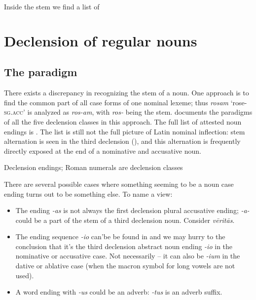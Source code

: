 \documentclass[a4paper, oneside, 12pt]{report}
\newcommand*{\citepage}[1]{p.~{#1}}
\newcommand{\form}[1]{\emph{#1}}
\newcommand*{\category}[1]{\textsc{#1}}
\newcommand{\translate}[1]{`#1'}
\begin{document}
Inside the stem we find a list of 

\section{Declension of regular nouns}\label{sec:regular-noun-declension}

\subsection{The paradigm}\label{sec:noun.paradigm.introduction}

There exists a discrepancy in recognizing the stem of a noun.
One approach is to find the common part 
of all case forms of one nominal lexeme;
thus \form{rosam} \translate{rose-\category{sg}.\category{acc}}
is analyzed as \form{ros-am}, 
with \form{ros-} being the stem.
\citet[\citepage{17}]{allen1903allen} documents the paradigms of all the five declension classes 
in this approach.
The full list of attested noun endings is .
The list is still not the full picture of Latin nominal inflection:
stem alternation is seen in the third declension
(),
and this alternation is frequently directly exposed at the end of a nominative and accusative noun.

\begin{table}[H]
    \caption{Declension endings; Roman numerals are declension classes}
    \label{tbl:declension-ending-nouns-list}
    \centering
    
\end{table}

There are several possible cases where something seeming to be a noun case ending 
turns out to be something else.
To name a view:
\begin{itemize}
    \item The ending \form{-as} is not always the first declension plural accusative ending;
    \form{-a-} could be a part of the stem of a third declension noun.
    Consider \form{vēritās}.
    \item The ending sequence \form{-io} can'be be found in 
    and we may hurry to the conclusion 
    that it's the third declension abstract noun ending \form{-io} 
    in the nominative or accusative case.
    Not necessarily -- 
    it can also be \form{-ium} in the dative or ablative case 
    (when the macron symbol for long vowels are not used).
    \item A word ending with \form{-us} could be an adverb:  
        \form{-tus} is an adverb suffix.
\end{itemize}
\end{document}
